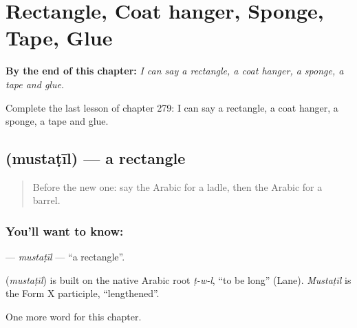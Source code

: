 
\chapter{Rectangle, Coat hanger, Sponge, Tape, Glue}
\label{ch:ar-rectangle-coat-hanger-sponge-tape-glue}

\begin{chapteropening}
\textbf{By the end of this chapter:} \emph{I can say a rectangle, a coat hanger, a sponge, a tape and glue.}

Complete the last lesson of chapter 279: I can say a rectangle, a coat hanger, a sponge, a tape and glue.
\end{chapteropening}

\section[\texorpdfstring{\ar{مستطيل} (mustaṭīl)}{مستطيل (mustaṭīl)}]{ (mustaṭīl) — a rectangle}

\label{lesson:AR-C279-mustatil}



\begin{quote}
Before the new one: say the Arabic for a ladle, then the Arabic for a barrel.
\end{quote}

\subsection*{You'll want to know: }
\textbf{} — \emph{mustaṭīl} — \textquotedblleft{}a rectangle\textquotedblright{}.

\begin{cousinweb}
\textbf{} (\emph{mustaṭīl}) is built on the native Arabic root \emph{ṭ-w-l}, \textquotedblleft{}to be long\textquotedblright{} (Lane). \emph{Mustaṭīl} is the Form X participle, \textquotedblleft{}lengthened\textquotedblright{}.
\end{cousinweb}

\begin{grammarlens}[title={What you've built}]
One more word for this chapter.
\end{grammarlens}

